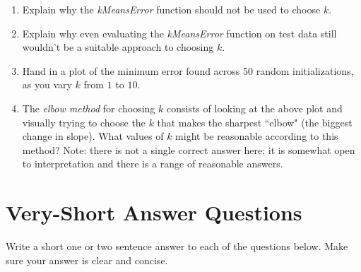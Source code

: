 \documentclass{article}
\def\blu#1{{\color{blu}#1}}
\def\enum#1{\begin{enumerate}#1\end{enumerate}}
\begin{document}
 \blu{\enum{
 \item Explain why the \emph{kMeansError} function should not be used to choose $k$.
 \item Explain why even evaluating the \emph{kMeansError} function on test data still wouldn't be a suitable approach to choosing $k$.
 \item Hand in a plot of the minimum error found across 50 random initializations, as you vary $k$ from $1$ to $10$.
 \item The \emph{elbow method} for choosing $k$ consists of looking at the above plot and visually trying to choose the $k$ that makes the sharpest ``elbow" (the biggest change in slope). What values of $k$ might be reasonable according to this method? Note: there is not a single correct answer here; it is somewhat open to interpretation and there is a range of reasonable answers.
 }}
 



\section{Very-Short Answer Questions}

\blu{Write a short one or two sentence answer to each of the questions below}. Make sure your answer is clear and concise.
\end{document}
